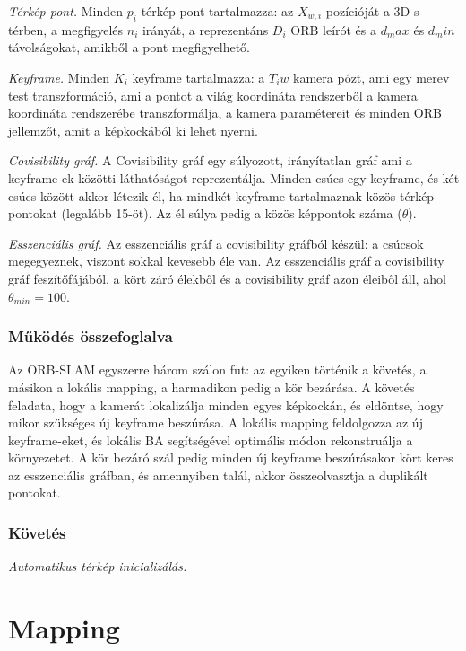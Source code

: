 \textit{Térkép pont.} Minden $p_i$ térkép pont tartalmazza: az $X_{w, i}$ pozícióját a 3D-s térben, a megfigyelés $n_i$ irányát, a reprezentáns $D_i$ ORB leírót és a $d_max$ és $d_min$ távolságokat, amikből a pont megfigyelhető.

\textit{Keyframe.} Minden $K_i$ keyframe tartalmazza: a $T_iw$ kamera pózt, ami egy merev test transzformáció, ami a pontot a világ koordináta rendszerből a kamera koordináta rendszerébe transzformálja, a kamera paramétereit és minden ORB jellemzőt, amit a képkockából ki lehet nyerni. 

\textit{Covisibility gráf.} A Covisibility gráf egy súlyozott, irányítatlan gráf ami a keyframe-ek közötti láthatóságot reprezentálja. 
Minden csúcs egy keyframe, és két csúcs között akkor létezik él, ha mindkét keyframe tartalmaznak közös térkép pontokat (legalább 15-öt). 
Az él súlya pedig a közös képpontok száma ($\theta$).

\textit{Esszenciális gráf.} Az esszenciális gráf a covisibility gráfból készül: a csúcsok megegyeznek, viszont sokkal kevesebb éle van. 
Az esszenciális gráf a covisibility gráf feszítőfájából, a kört záró élekből és a covisibility gráf azon éleiből áll, ahol $\theta_{min} = 100$.

\subsubsection{Működés összefoglalva}
Az ORB-SLAM egyszerre három szálon fut: az egyiken történik a követés, a másikon a lokális mapping, a harmadikon pedig a kör bezárása.
A követés feladata, hogy a kamerát lokalizálja minden egyes képkockán, és eldöntse, hogy mikor szükséges új keyframe beszúrása.
A lokális mapping feldolgozza az új keyframe-eket, és lokális BA segítségével optimális módon rekonstruálja a környezetet.
A kör bezáró szál pedig minden új keyframe beszúrásakor kört keres az esszenciális gráfban, és amennyiben talál, akkor összeolvasztja a duplikált pontokat.

\subsubsection{Követés}

\textit{Automatikus térkép inicializálás.} 


\section{Mapping}


